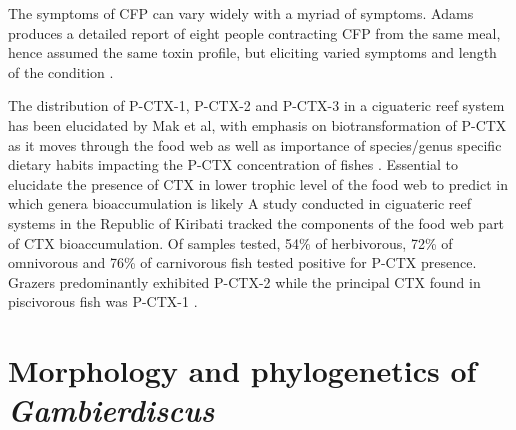 \documentclass[12pt]{article}
\begin{document}
The symptoms of CFP can vary widely with a myriad of symptoms. Adams produces a detailed report of eight people contracting CFP from the same meal, hence assumed the same toxin profile, but eliciting varied symptoms and length of the condition \cite{adams1993outbreak}.


The distribution of P-CTX-1, P-CTX-2 and P-CTX-3 in a ciguateric reef system has been elucidated by Mak et al, with emphasis on biotransformation of P-CTX as it moves through the food web as well as importance of species/genus specific dietary habits impacting the P-CTX concentration of fishes \cite{mak2013pacific}.
Essential to elucidate the presence of CTX in lower trophic level of the food web to predict in which genera bioaccumulation is likely \cite{mak2013pacific}
A study conducted in ciguateric reef systems in the Republic of Kiribati tracked the components of the food web part of CTX bioaccumulation. Of samples tested, 54\% of herbivorous, 72\% of omnivorous and 76\% of carnivorous fish tested positive for P-CTX presence. Grazers predominantly exhibited P-CTX-2 while the principal CTX found in piscivorous fish was P-CTX-1 \cite{mak2013pacific}.

\section{Morphology and phylogenetics of \emph{Gambierdiscus}}
\end{document}
